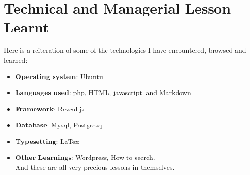 
\section{Technical and Managerial Lesson Learnt}
Here is a reiteration of some of the technologies I have encountered,
browsed and learned:
\begin{itemize}
\item {\bf{Operating system}}: Ubuntu
\item {\bf{Languages used}}: php, HTML, javascript, and Markdown
\item {\bf{Framework}}: Reveal.js
\item {\bf{Database}}: Mysql, Postgresql
\item {\bf{Typesetting}}: LaTex
\item {\bf{Other Learnings}}:  Wordpress, How to search.\\
And these are all very precious lessons in themselves.
\end{itemize}



